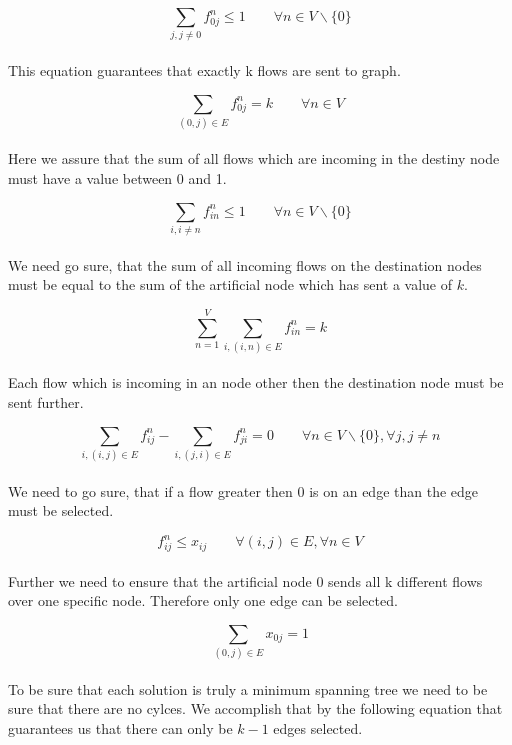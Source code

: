 \begin{equation}
  \sum_{j, j \neq 0}  f_{0j}^n \leq 1 \qquad \forall n \in V \backslash \{0\}
\end{equation}
\\
This equation guarantees that exactly k flows are sent to graph.

\begin{equation}
  \sum_{(0,j) \in E}  f_{0j}^n = k \qquad \forall n \in V
\end{equation}
\\
Here we assure that the sum of all flows which are incoming in the destiny node must have a value between 0 and 1.

\begin{equation}
  \sum_{i, i \neq n}  f_{in}^n \leq 1 \qquad \forall n \in V \backslash \{0\}
\end{equation}
\\
We need go sure, that the sum of all incoming flows on the destination nodes must be equal to the sum of the artificial node which has sent a value of $k$.

\begin{equation}
  \sum_{n=1}^V \sum_{i, (i,n) \in E}  f_{in}^n= k
\end{equation}
\\
Each flow which is incoming in an node other then the destination node must be sent further.

\begin{equation}
  \sum_{i, (i,j) \in E}  f_{ij}^n -  \sum_{i, (j,i) \in E}  f_{ji}^n = 0 \qquad \forall n \in V \backslash \{0\}, \forall j, j \neq n
\end{equation}
\\
We need to go sure, that if a flow greater then 0 is on an edge than the edge must be selected.

\begin{equation}
  f_{ij}^n \leq x_{ij} \qquad \forall (i,j) \in E, \forall n \in V
\end{equation}
\\
Further we need to ensure that the artificial node $0$ sends all k different flows over one specific node. Therefore only one edge can be selected.

\begin{equation}
  \sum_{(0, j) \in E}  x_{0j} = 1
\end{equation}
\\
To be sure that each solution is truly a minimum spanning tree we need to be sure that there are no cylces. We accomplish that by the following equation that guarantees us that there can only be $k-1$ edges selected.

